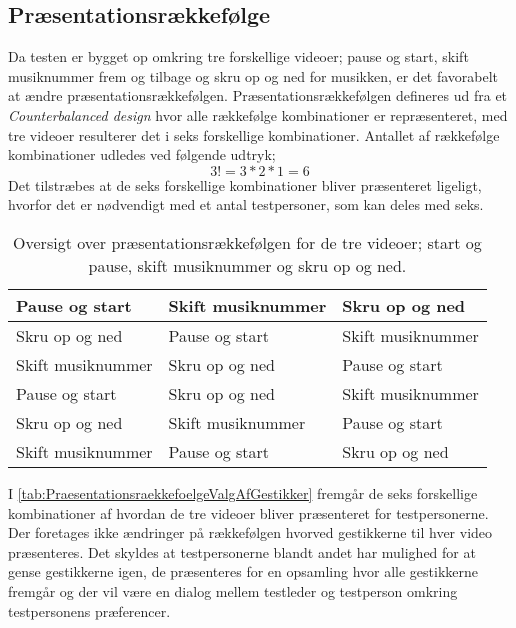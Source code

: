 \subsection{Præsentationsrækkefølge}
\label{PraesentationsraekkefoelgeValgAfGestikker}
%
Da testen er bygget op omkring tre forskellige videoer; pause og start, skift musiknummer frem og tilbage og skru op og ned for musikken, er det favorabelt at ændre præsentationsrækkefølgen. Præsentationsrækkefølgen defineres ud fra et \textit{Counterbalanced design} hvor alle rækkefølge kombinationer er repræsenteret, med tre videoer resulterer det i seks forskellige kombinationer. Antallet af rækkefølge kombinationer udledes ved følgende udtryk;
%
\begin{equation}
	3! = 3*2*1 = 6
\end{equation}
%
Det tilstræbes at de seks forskellige kombinationer bliver præsenteret ligeligt, hvorfor det er nødvendigt med et antal testpersoner, som kan deles med seks.
%
\begin{table}[H]
	\centering
	\begin{tabular}{ |  p{4cm}  |  p{4cm}  |  p{4cm}  |}
		\hline
		Pause og start & Skift musiknummer & Skru op og ned \\ \hline
		Skru op og ned & Pause og start & Skift musiknummer\\ \hline
		Skift musiknummer & Skru op og ned & Pause og start \\ \hline
		Pause og start & Skru op og ned & Skift musiknummer\\ \hline
		Skru op og ned & Skift musiknummer & Pause og start\\ \hline
		Skift musiknummer & Pause og start & Skru op og ned \\ \hline
	\end{tabular}
	\caption{Oversigt over præsentationsrækkefølgen for de tre videoer; start og pause, skift musiknummer og skru op og ned.}
	\label{tab:PraesentationsraekkefoelgeValgAfGestikker}
\end{table}
\noindent
%
I \autoref{tab:PraesentationsraekkefoelgeValgAfGestikker} fremgår de seks forskellige kombinationer af hvordan de tre videoer bliver præsenteret for testpersonerne. Der foretages ikke ændringer på rækkefølgen hvorved gestikkerne til hver video præsenteres. Det skyldes at testpersonerne blandt andet har mulighed for at gense gestikkerne igen, de præsenteres for en opsamling hvor alle gestikkerne fremgår og der vil være en dialog mellem testleder og testperson omkring testpersonens præferencer.  
%
